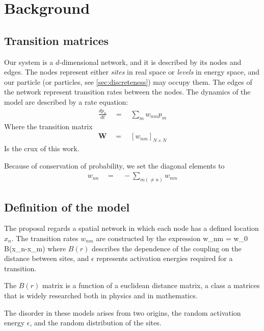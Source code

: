 \chapter{Background}

 
\section{Transition matrices}

Our system is a $d$-dimensional network, and it is
described by its nodes and edges. The nodes represent 
either {\em sites} in real space or {\em levels} in energy space, 
and our particle (or particles, see \ref{sec:discreteness}) may
occupy them. The edges of the network represent transition rates 
between the nodes. The dynamics of the model are described by 
a rate equation:
%
\begin{align}
\frac{dp_n}{dt} \quad = \quad \sum_m w_{nm}p_m
\end{align}
%
Where the transition matrix 
%
\begin{align}
\mathbf{W} \quad =  \quad \left[ w_{nm}\right]_{N\times N}
\end{align}
%
Is the crux of this work.

Because of conservation of probability, we set the diagonal
elements to
%
\begin{align}
w_{nn}\quad = \quad -\sum_{m(\ne n)} w_{mn}
\end{align}
%


\section{Definition of the model}


The proposal regards a spatial network in which each node
has a defined location $x_n$. The transition rates $w_{nm}$
are constructed by the expression
%
\beq
w_{nm} \quad = \quad w_0 B(x_n-x_m)
\eeq
%
where $B(r)$ describes the dependence of the coupling on the
distance between sites, and $\epsilon$ represents activation
energies required for a transition.


The $B(r)$ matrix is a function of a euclidean distance matrix,
a class a matrices that is widely researched 
\cite{skipetrov_eigenvalue_2011, goetschy_non-hermitian_2011,mezard_spectra_1999, bogomolny_spectral_2003}
both in physics and in mathematics.


The disorder in these models arises from two origins, 
the random activation energy $\epsilon$, and the random distribution of the sites.


